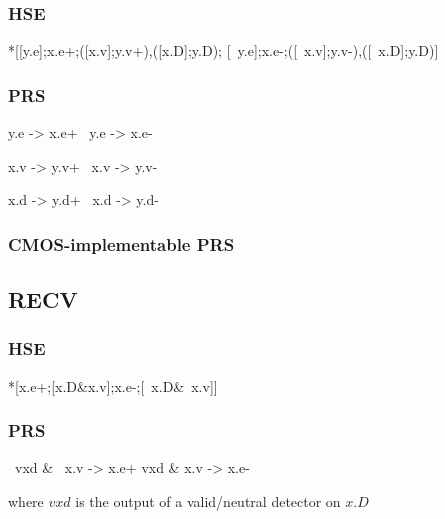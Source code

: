 \documentclass{article}
\begin{document}
\subsubsection{HSE}

\begin{hse}
*[[y.e];x.e+;([x.v];y.v+),([x.D];y.D\!\Uparrow);
  [~y.e];x.e-;([~x.v];y.v-),([~x.D];y.D\!\Downarrow)]
\end{hse}

\subsubsection{PRS}

\begin{prs2}
y.e -> x.e+
~y.e -> x.e-
\end{prs2}

\begin{prs2}
x.v -> y.v+
~x.v -> y.v-

x.d -> y.d+
~x.d -> y.d-
\end{prs2}

\subsubsection{CMOS-implementable PRS}

\subsection{RECV}

\subsubsection{HSE}

\begin{hse}
*[x.e+;[x.D&x.v];x.e-;[~x.D&~x.v]]
\end{hse}

\subsubsection{PRS}

\begin{prs2}
~vxd & ~x.v -> x.e+
vxd & x.v -> x.e-
\end{prs2}

where $vxd$ is the output of a valid/neutral detector on $x.D$
\end{document}
